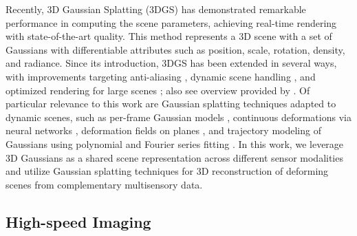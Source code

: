 Recently, 3D Gaussian Splatting (3DGS) \cite{kerbl20233d} has demonstrated remarkable performance in computing the scene parameters, achieving real-time rendering with state-of-the-art quality. 
This method represents a 3D scene with a set of Gaussians with differentiable attributes such as position, scale, rotation, density, and radiance.
Since its introduction, 3DGS has been extended in several ways,
with improvements targeting anti-aliasing \cite{mip-splatting}, dynamic scene handling \cite{yang2023gs4d, duan20244d}, and optimized rendering for large scenes \cite{hierarchGS}; also see overview provided by \cite{fei20243d}.
Of particular relevance to this work are Gaussian splatting techniques adapted to dynamic scenes, such as per-frame Gaussian models \cite{luiten2024dynamic}, continuous deformations via neural networks \cite{xie2024gaussian, yang2024deformable}, deformation fields on planes \cite{wu20244d}, and trajectory modeling of Gaussians using polynomial and Fourier series fitting \cite{gao2024gaussianflow}. 
In this work, we leverage 3D Gaussians as a shared scene representation across different sensor modalities and utilize Gaussian splatting techniques for 3D reconstruction of deforming scenes from complementary multisensory data.



\subsection{High-speed Imaging}

